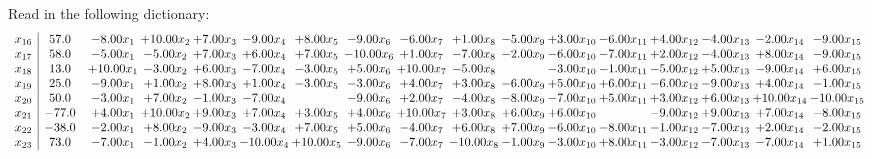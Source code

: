 \documentclass[9pt]{article}
\begin{document}
Read in the following dictionary:
\[\begin{array}{c| c c@{\hskip 2pt} c@{\hskip 2pt} c@{\hskip 2pt} c@{\hskip 2pt} c@{\hskip 2pt} c@{\hskip 2pt} c@{\hskip 2pt} c@{\hskip 2pt} c@{\hskip 2pt} c@{\hskip 2pt} c@{\hskip 2pt} c@{\hskip 2pt} c@{\hskip 2pt} c@{\hskip 2pt} c@{\hskip 2pt} }
 x_{16}   &  57.0 & -8.00 x_{1} & + 10.00 x_{2} & +  7.00 x_{3} & -9.00 x_{4} & +  8.00 x_{5} & -9.00 x_{6} & -6.00 x_{7} & +  1.00 x_{8} & -5.00 x_{9} & +  3.00 x_{10} & -6.00 x_{11} & +  4.00 x_{12} & -4.00 x_{13} & -2.00 x_{14} & -9.00 x_{15}\\
 x_{17}   &  58.0 & -5.00 x_{1} & -5.00 x_{2} & +  7.00 x_{3} & +  6.00 x_{4} & +  7.00 x_{5} & -10.00 x_{6} & +  1.00 x_{7} & -7.00 x_{8} & -2.00 x_{9} & -6.00 x_{10} & -7.00 x_{11} & +  2.00 x_{12} & -4.00 x_{13} & +  8.00 x_{14} & -9.00 x_{15}\\
 x_{18}   &  13.0 & + 10.00 x_{1} & -3.00 x_{2} & +  6.00 x_{3} & -7.00 x_{4} & -3.00 x_{5} & +  5.00 x_{6} & + 10.00 x_{7} & -5.00 x_{8} &   & -3.00 x_{10} & -1.00 x_{11} & -5.00 x_{12} & +  5.00 x_{13} & -9.00 x_{14} & +  6.00 x_{15}\\
 x_{19}   &  25.0 & -9.00 x_{1} & +  1.00 x_{2} & +  8.00 x_{3} & +  1.00 x_{4} & -3.00 x_{5} & -3.00 x_{6} & +  4.00 x_{7} & +  3.00 x_{8} & -6.00 x_{9} & +  5.00 x_{10} & +  6.00 x_{11} & -6.00 x_{12} & -9.00 x_{13} & +  4.00 x_{14} & -1.00 x_{15}\\
 x_{20}   &  50.0 & -3.00 x_{1} & +  7.00 x_{2} & -1.00 x_{3} & -7.00 x_{4} &   & -9.00 x_{6} & +  2.00 x_{7} & -4.00 x_{8} & -8.00 x_{9} & -7.00 x_{10} & +  5.00 x_{11} & +  3.00 x_{12} & +  6.00 x_{13} & + 10.00 x_{14} & -10.00 x_{15}\\
 x_{21}   &  -77.0 & +  4.00 x_{1} & + 10.00 x_{2} & +  9.00 x_{3} & +  7.00 x_{4} & +  3.00 x_{5} & +  4.00 x_{6} & + 10.00 x_{7} & +  3.00 x_{8} & +  6.00 x_{9} & +  6.00 x_{10} &   & -9.00 x_{12} & +  9.00 x_{13} & +  7.00 x_{14} & -8.00 x_{15}\\
 x_{22}   &  -38.0 & -2.00 x_{1} & +  8.00 x_{2} & -9.00 x_{3} & -3.00 x_{4} & +  7.00 x_{5} & +  5.00 x_{6} & -4.00 x_{7} & +  6.00 x_{8} & +  7.00 x_{9} & -6.00 x_{10} & -8.00 x_{11} & -1.00 x_{12} & -7.00 x_{13} & +  2.00 x_{14} & -2.00 x_{15}\\
 x_{23}   &  73.0 & -7.00 x_{1} & -1.00 x_{2} & +  4.00 x_{3} & -10.00 x_{4} & + 10.00 x_{5} & -9.00 x_{6} & -7.00 x_{7} & -10.00 x_{8} & -1.00 x_{9} & -3.00 x_{10} & +  8.00 x_{11} & -3.00 x_{12} & -7.00 x_{13} & -7.00 x_{14} & +  1.00 x_{15}\\

\end{array}\]
\end{document}
